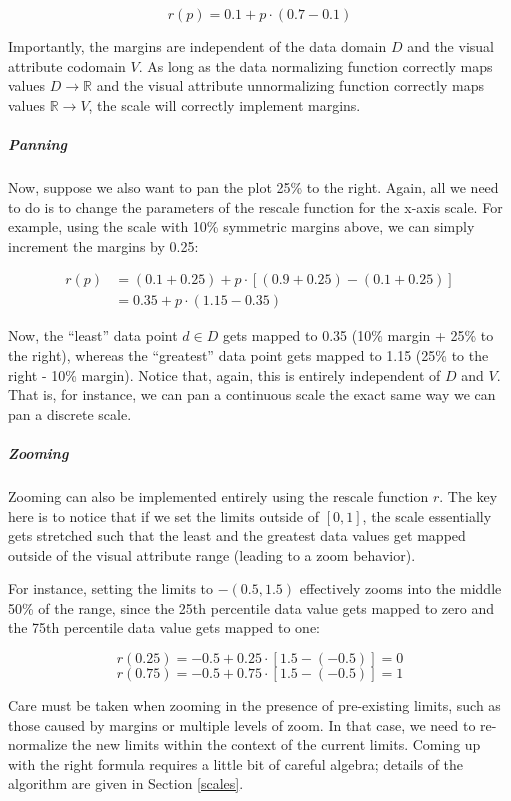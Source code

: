 \documentclass[
  openany]{book}
\theoremstyle{definition}
\theoremstyle{definition}
\theoremstyle{definition}
\theoremstyle{definition}
\theoremstyle{remark}
\begin{document}
\[r(p) = 0.1 + p \cdot (0.7 - 0.1)\]

Importantly, the margins are independent of the data domain \(D\) and the visual attribute codomain \(V\). As long as the data normalizing function correctly maps values \(D \to \mathbb{R}\) and the visual attribute unnormalizing function correctly maps values \(\mathbb{R} \to V\), the scale will correctly implement margins.

\subparagraph{Panning}\label{panning}

Now, suppose we also want to pan the plot 25\% to the right. Again, all we need to do is to change the parameters of the rescale function for the x-axis scale. For example, using the scale with 10\% symmetric margins above, we can simply increment the margins by 0.25:

\begin{align}
r(p) &= (0.1 + 0.25) + p \cdot [(0.9 + 0.25) - (0.1 + 0.25)] \\
    &= 0.35 + p \cdot (1.15 - 0.35)
\end{align}

Now, the ``least'' data point \(d \in D\) gets mapped to 0.35 (10\% margin + 25\% to the right), whereas the ``greatest'' data point gets mapped to 1.15 (25\% to the right - 10\% margin). Notice that, again, this is entirely independent of \(D\) and \(V\). That is, for instance, we can pan a continuous scale the exact same way we can pan a discrete scale.

\subparagraph{Zooming}\label{zooming}

Zooming can also be implemented entirely using the rescale function \(r\). The key here is to notice that if we set the limits outside of \([0, 1]\), the scale essentially gets stretched such that the least and the greatest data values get mapped outside of the visual attribute range (leading to a zoom behavior).

For instance, setting the limits to \(-(0.5, 1.5)\) effectively zooms into the middle 50\% of the range, since the 25th percentile data value gets mapped to zero and the 75th percentile data value gets mapped to one:

\[r(0.25) = -0.5 + 0.25 \cdot [1.5 - (-0.5)] = 0\]
\[r(0.75) = -0.5 + 0.75 \cdot [1.5 - (-0.5)] = 1\]

Care must be taken when zooming in the presence of pre-existing limits, such as those caused by margins or multiple levels of zoom. In that case, we need to re-normalize the new limits within the context of the current limits. Coming up with the right formula requires a little bit of careful algebra; details of the algorithm are given in Section \ref{scales}.
\end{document}
